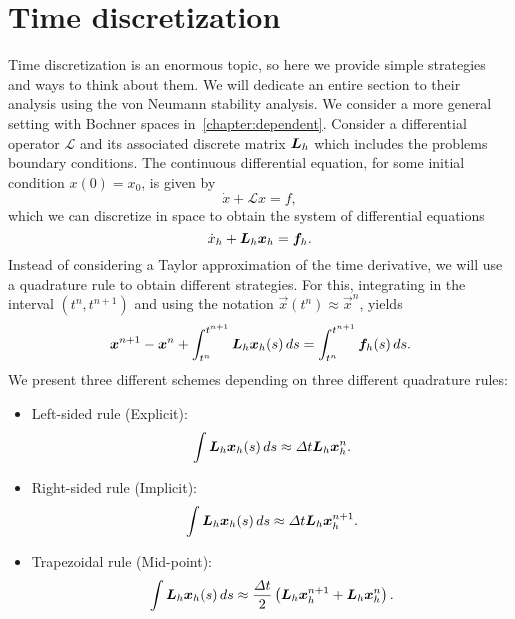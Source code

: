 \section{Time discretization}
Time discretization is an enormous topic, so here we provide simple strategies and ways to think about them. We will dedicate an entire section to their analysis using the von Neumann stability analysis. We consider a more general setting with Bochner spaces in~\ref{chapter:dependent}. Consider a differential operator $\mathcal L$ and its associated discrete matrix $\mat L_h$ which includes the problems boundary conditions. The continuous differential equation, for some initial condition $x(0) = x_0$, is given by 
\begin{equation}
    \dot x + \mathcal L x = f,
\end{equation}
which we can discretize in space to obtain the system of differential equations
\begin{equation}
    \dot x_h + \mat L_h \vec x_h = \vec f_h.
\end{equation}
Instead of considering a Taylor approximation of the time derivative, we will use a quadrature rule to obtain different strategies. For this, integrating in the interval $(t^n, t^{n+1})$ and using the notation $\vec x(t^n) \approx \vec x^{n}$, yields
\begin{equation}
    \vec x^{n+1} - \vec x^n + \int_{t^n}^{t^{n+1}} \mat L_h \vec x_h(s) \,ds = \int_{t^n}^{t^{n+1}} \vec f_h(s)\,ds.
\end{equation}
We present three different schemes depending on three different quadrature rules: 
\begin{itemize}
    \item Left-sided rule (Explicit):
        \begin{equation}
            \int \mat L_h \vec x_h(s)\,ds \approx \Delta t \mat L_h\vec x_h^n.
        \end{equation}
    \item Right-sided rule (Implicit): 
        \begin{equation}
            \int \mat L_h \vec x_h(s)\,ds \approx \Delta t\mat L_h\vec x_h^{n+1}.
        \end{equation}
    \item Trapezoidal rule (Mid-point): 
        \begin{equation}
            \int \mat L_h \vec x_h(s)\,ds \approx \frac{\Delta t}{2}\left(\mat L_h\vec x_h^{n+1}+ \mat L_h \vec x_h^n\right).
        \end{equation}
    \end{itemize}
